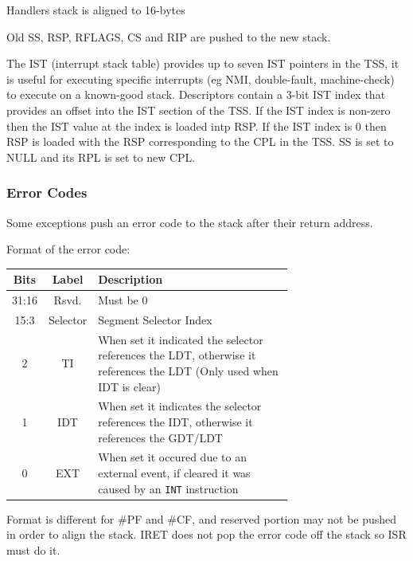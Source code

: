 \documentclass{article}
\newcommand{\layout}[1]{\parbox{\linewidth}{#1}}
\begin{document}
\layout{
  Handlers stack is aligned to 16-bytes

  \bigskip \cite[Chapter~7.14.2]{sdm3}
} \bigskip

\layout{
  Old SS, RSP, RFLAGS, CS and RIP are pushed to the new stack.

  \bigskip

  The IST (interrupt stack table) provides up to seven IST pointers in the TSS,
  it is useful for executing specific interrupts (eg NMI, double-fault, machine-check) to execute on a known-good stack.
  Descriptors contain a 3-bit IST index that provides an offset into the IST section of the TSS.
  If the IST index is non-zero then the IST value at the index is loaded intp RSP.
  If the IST index is 0 then RSP is loaded with the RSP corresponding to the CPL in the TSS.
  SS is set to NULL and its RPL is set to new CPL.

  \bigskip \cite[Chapter~7.14.5]{sdm3}
} \bigskip

\layout{
  \subsubsection{Error Codes}

  Some exceptions push an error code to the stack after their return address.

  \bigskip

  Format of the error code:
  \begin{table}[H]
    \centering
    \begin{tabular}{|c|c|m{0.7\linewidth}|}
      \hline \textbf{Bits} & \textbf{Label} & \textbf{Description} \\ \hline
      31:16 & Rsvd. & Must be 0 \\
      15:3 & Selector & Segment Selector Index \\
      2 & TI & When set it indicated the selector references the LDT, otherwise it references the LDT (Only used when IDT is clear) \\
      1 & IDT & When set it indicates the selector references the IDT, otherwise it references the GDT/LDT \\
      0 & EXT & When set it occured due to an external event, if cleared it was caused by an \texttt{INT} instruction \\ \hline
    \end{tabular}
  \end{table}

  Format is different for \#PF and \#CF, and reserved portion may not be pushed in order to align the stack.
  IRET does not pop the error code off the stack so ISR must do it.

  \bigskip \cite[Chapter~7.13]{sdm3}
}
\end{document}

